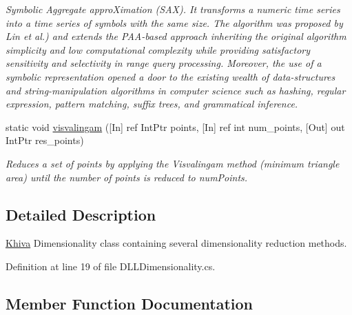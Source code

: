 \begin{DoxyCompactItemize}
\begin{DoxyCompactList}\small\item\em Symbolic Aggregate appro\+Ximation (S\+AX). It transforms a numeric time series into a time series of symbols with the same size. The algorithm was proposed by Lin et al.) and extends the P\+A\+A-\/based approach inheriting the original algorithm simplicity and low computational complexity while providing satisfactory sensitivity and selectivity in range query processing. Moreover, the use of a symbolic representation opened a door to the existing wealth of data-\/structures and string-\/manipulation algorithms in computer science such as hashing, regular expression, pattern matching, suffix trees, and grammatical inference. \end{DoxyCompactList}\item 
static void \mbox{\hyperlink{classkhiva_1_1interop_1_1_d_l_l_dimensionality_af04060492f8d33205549517696003194}{visvalingam}} (\mbox{[}In\mbox{]} ref Int\+Ptr points, \mbox{[}In\mbox{]} ref int num\+\_\+points, \mbox{[}Out\mbox{]} out Int\+Ptr res\+\_\+points)
\begin{DoxyCompactList}\small\item\em Reduces a set of points by applying the Visvalingam method (minimum triangle area) until the number of points is reduced to num\+Points. \end{DoxyCompactList}\end{DoxyCompactItemize}


\subsection{Detailed Description}
\mbox{\hyperlink{classkhiva_1_1_khiva}{Khiva}} Dimensionality class containing several dimensionality reduction methods. 



Definition at line 19 of file D\+L\+L\+Dimensionality.\+cs.



\subsection{Member Function Documentation}
\mbox{\label{classkhiva_1_1interop_1_1_d_l_l_dimensionality_a4c419ec83c5c61c775ed3b3fc2940517}} 
